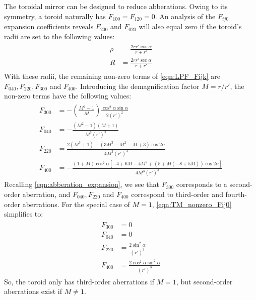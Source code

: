 The toroidal mirror can be designed to reduce abberations. Owing to its symmetry, a toroid naturally has ${F_{100} = F_{120} = 0}$. An analysis of the $F_{ij0}$ expansion coefficients reveals $F_{200}$ and $F_{020}$ will also equal zero if the toroid's radii are set to the following values:
\begin{gather}
\begin{aligned}
\rho &= \frac{2 r r' \cos \alpha}{r + r'} \\
R &= \frac{2 r r' \sec \alpha}{r+r'}
\end{aligned} 
\end{gather}
With these radii, the remaining non-zero terms of \cref{eqn:LPF_Fijk} are $F_{040}, F_{220}, F_{300}$ and $F_{400}$. Introducing the demagnification factor $M = r / r'$, the non-zero terms have the following values:
\begin{gather}
\begin{aligned}
F_{300} &= - \left( \frac{M^2-1}{M} \right) \frac{\cos^2 \alpha \sin \alpha}{2 (r')^2} \\
F_{040} &= - \frac{(M^2-1)(M+1)}{M^3 (r')^3} \\
F_{220} &= \frac{2 (M^3+1) - (3M^3 - M^2 - M + 3) \cos 2 \alpha}{4 M^3 (r')^3} \\
F_{400} &= - \frac{(1+M) \cos^2 \alpha \left[-4 + 6M -4M^2 + (5+M(-8+5M)) \cos 2 \alpha\right]}{4 M^3 (r')^3}
\end{aligned}
\label{eqn:TM_nonzero_Fij0}
\end{gather}
Recalling \cref{eqn:abberation_expansion}, we see that $F_{300}$ corresponds to a second-order aberration, and $F_{040}, F_{220}$ and $F_{400}$ correspond to third-order and fourth-order aberrations. For the special case of $M=1$, \cref{eqn:TM_nonzero_Fij0} simplifies to:
\begin{gather}
\begin{aligned}
F_{300} &= 0 \\
F_{040} &= 0 \\
F_{220} &= \frac{2 \sin^2 \alpha}{(r')^3} \\
F_{400} &= \frac{2 \cos^2 \alpha \sin^2 \alpha}{(r')^3}
\end{aligned}
\end{gather}
So, the toroid only has third-order aberrations if $M=1$, but second-order aberrations exist if $M \ne 1$.

